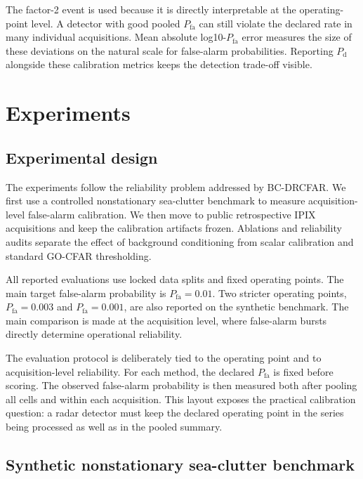 \documentclass[preprint,12pt]{elsarticle}
\begin{document}
The factor-2 event is used because it is directly interpretable at the
operating-point level. A detector with good pooled $P_{\mathrm{fa}}$ can still
violate the declared rate in many individual acquisitions. Mean absolute
log10-$P_{\mathrm{fa}}$ error measures the size of these deviations on the
natural scale for false-alarm probabilities. Reporting $P_{\mathrm{d}}$
alongside these calibration metrics keeps the detection trade-off visible.

\section{Experiments}
\label{sec:experiments}

\subsection{Experimental design}
\label{subsec:experimental-design}

The experiments follow the reliability problem addressed by BC-DRCFAR. We first
use a controlled nonstationary sea-clutter benchmark to measure
acquisition-level false-alarm calibration. We then move to public retrospective
IPIX acquisitions and keep the calibration artifacts frozen. Ablations and
reliability audits separate the effect of background conditioning from scalar
calibration and standard GO-CFAR thresholding.

All reported evaluations use locked data splits and fixed operating points. The
main target false-alarm probability is $P_{\mathrm{fa}}=0.01$. Two stricter
operating points, $P_{\mathrm{fa}}=0.003$ and $P_{\mathrm{fa}}=0.001$, are also
reported on the synthetic benchmark. The main comparison is made at the
acquisition level, where false-alarm bursts directly determine operational
reliability.

The evaluation protocol is deliberately tied to the operating point and to
acquisition-level reliability. For each method, the declared
$P_{\mathrm{fa}}$ is fixed before scoring. The observed false-alarm probability
is then measured both after pooling all cells and within each acquisition. This
layout exposes the practical calibration question: a radar detector must keep
the declared operating point in the series being processed as well as in the
pooled summary.

\subsection{Synthetic nonstationary sea-clutter benchmark}
\label{subsec:synthetic}
\end{document}
